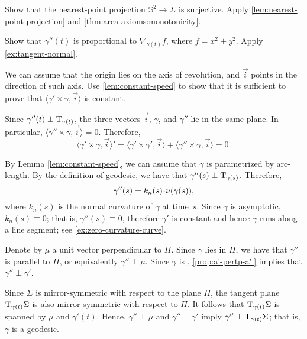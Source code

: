 \begin{multicols}{2}
Show that the nearest-point projection $\mathbb{S}^2\to\Sigma$ is surjective.
Apply \ref{lem:nearest-point-projection} and \ref{thm:area-axioms:monotonicity}.


\setcounter{eqtn}{0}

 Show that $\gamma''(t)$ is proportional to $\nabla_{\gamma(t)} f$, where $f=x^2+y^2$. 
Apply \ref{ex:tangent-normal}.

We can assume that the origin lies on the axis of revolution, and $\vec i$ points in the direction of such axis.
Use \ref{lem:constant-speed} to show that it is sufficient to prove that 
$\langle\gamma'\times \gamma,\vec i\rangle$
is constant.

Since $\gamma''(t)\perp\mathrm{T}_{\gamma(t)}$, the three vectors $\vec i$, $\gamma$, and $\gamma''$ lie in the same plane.
In particular, $\langle\gamma''\times \gamma,\vec i\rangle=0$.
Therefore,
\[
\langle\gamma'\times \gamma,\vec i\rangle'
=
\langle\gamma'\times \gamma',\vec i\rangle+\langle\gamma''\times \gamma,\vec i\rangle =0
.\]



 By Lemma \ref{lem:constant-speed},
we can assume that $\gamma$ is parametrized by arc-length.
By the definition of geodesic, we have that $\gamma''(s)\perp\mathrm{T}_{\gamma(s)}$. 
Therefore, 
\[\gamma''(s)=k_n(s)\cdot\Norm(\gamma(s)),\]
where $k_n(s)$ is the normal curvature of $\gamma$ at time~$s$.
Since $\gamma$ is asymptotic, $k_n(s)\equiv 0$;
that is, $\gamma''(s)\equiv 0$, therefore $\gamma'$ is constant and hence $\gamma$ runs along a line segment; see \ref{ex:zero-curvature-curve}.




Denote by $\mu$ a unit vector perpendicular to $\Pi$.
Since $\gamma$ lies in $\Pi$, we have that $\gamma''$ is parallel to $\Pi$, or equivalently $\gamma''\perp \mu$.
Since $\gamma$ is , \ref{prop:a'-pertp-a''} implies that $\gamma''\perp\gamma'$.

Since $\Sigma$ is mirror-symmetric with respect to the plane $\Pi$,
the tangent plane $\mathrm{T}_{\gamma(t)}\Sigma$ is also mirror-symmetric with respect to $\Pi$.
It follows that $\mathrm{T}_{\gamma(t)}\Sigma$ is spanned by $\mu$ and $\gamma'(t)$.
Hence, $\gamma''\perp \mu$ and $\gamma''\perp\gamma'$ imply $\gamma''\perp\mathrm{T}_{\gamma(t)}\Sigma$;
that is, $\gamma$ is a geodesic.




\end{multicols}
